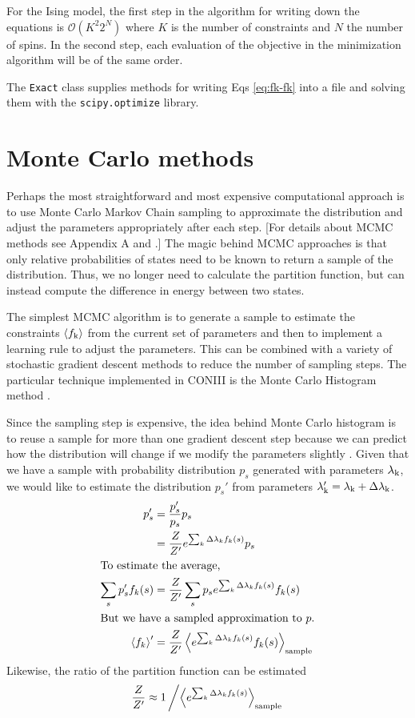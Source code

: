 \documentclass[aps,prl,twocolumn]{revtex4-1}
\begin{document}
For the Ising model, the first step in the algorithm for writing down the equations is $\mathcal{O}(K^2 2^{N})$ where $K$ is the number of constraints and $N$ the number of spins. In the second step, each evaluation of the objective in the minimization algorithm will be of the same order.

The {\tt Exact} class supplies methods for writing Eqs \ref{eq:fk-fk} into a file and solving them with the {\tt scipy.optimize} library.


\section{Monte Carlo methods}
Perhaps the most straightforward and most expensive computational approach is to use Monte Carlo Markov Chain sampling to approximate the distribution and adjust the parameters appropriately after each step. [For details about MCMC methods see Appendix A and \cite{MacKay:2005wc}.] The magic behind MCMC approaches is that only relative probabilities of states need to be known to return a sample of the distribution. Thus, we no longer need to calculate the partition function, but can instead compute the difference in energy between two states.

The simplest MCMC algorithm is to generate a sample to estimate the constraints $\left<f_{\rm k}\right>$ from the current set of parameters and then to implement a learning rule to adjust the parameters. This can be combined with a variety of stochastic gradient descent methods to reduce the number of sampling steps. The particular technique implemented in CONIII is the Monte Carlo Histogram method \cite{Broderick:2007wq}.

Since the sampling step is expensive, the idea behind Monte Carlo histogram is to reuse a sample for more than one gradient descent step because we can predict how the distribution will change if we modify the parameters slightly \cite{Broderick:2007wq}. Given that we have a sample with probability distribution $p_s$ generated with parameters $\lambda_{\rm k}$, we would like to estimate the distribution $p_s'$ from parameters $\lambda_{\rm k}' = \lambda_{\rm k}+\Delta\lambda_{\rm k}$.
\begin{align}
	p_s' &= \frac{p'_s}{p_s}p_s\\
		&= \frac{Z}{Z'}e^{\sum_k \Delta\lambda_k f_k(s)} p_s\\
\intertext{To estimate the average,}
	\sum_s p_s' f_k(s) &= \frac{Z}{Z'} \sum_s p_s e^{\sum_k \Delta\lambda_k f_k(s)} f_k(s)\\
\intertext{But we have a sampled approximation to $p$.}
	\left<f_k\right>' &= \frac{Z}{Z'} \left<e^{\sum_k \Delta\lambda_k f_k(s)} f_k(s)\right>_{\rm sample}
\end{align}
Likewise, the ratio of the partition function can be estimated
\begin{align}
	\frac{Z}{Z'} \approx 1\left/\left<e^{\sum_k \Delta\lambda_k f_k(s)}\right>_{\rm sample}\right.
\end{align}
\end{document}
